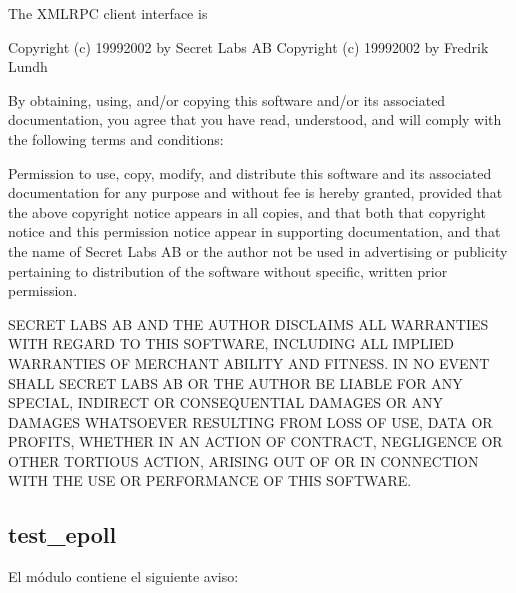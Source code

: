 \documentclass[a4,10pt,spanish]{sphinxmanual}
\begin{document}
\begin{sphinxVerbatim}[commandchars=\\\{\}]
    The XML\PYGZhy{}RPC client interface is

Copyright (c) 1999\PYGZhy{}2002 by Secret Labs AB
Copyright (c) 1999\PYGZhy{}2002 by Fredrik Lundh

By obtaining, using, and/or copying this software and/or its
associated documentation, you agree that you have read, understood,
and will comply with the following terms and conditions:

Permission to use, copy, modify, and distribute this software and
its associated documentation for any purpose and without fee is
hereby granted, provided that the above copyright notice appears in
all copies, and that both that copyright notice and this permission
notice appear in supporting documentation, and that the name of
Secret Labs AB or the author not be used in advertising or publicity
pertaining to distribution of the software without specific, written
prior permission.

SECRET LABS AB AND THE AUTHOR DISCLAIMS ALL WARRANTIES WITH REGARD
TO THIS SOFTWARE, INCLUDING ALL IMPLIED WARRANTIES OF MERCHANT\PYGZhy{}
ABILITY AND FITNESS.  IN NO EVENT SHALL SECRET LABS AB OR THE AUTHOR
BE LIABLE FOR ANY SPECIAL, INDIRECT OR CONSEQUENTIAL DAMAGES OR ANY
DAMAGES WHATSOEVER RESULTING FROM LOSS OF USE, DATA OR PROFITS,
WHETHER IN AN ACTION OF CONTRACT, NEGLIGENCE OR OTHER TORTIOUS
ACTION, ARISING OUT OF OR IN CONNECTION WITH THE USE OR PERFORMANCE
OF THIS SOFTWARE.
\end{sphinxVerbatim}


\subsection{test\_epoll}
\label{\detokenize{license:test-epoll}}
\sphinxAtStartPar
El módulo  contiene el siguiente aviso:
\end{document}
